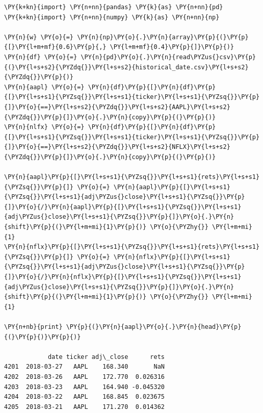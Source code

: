 \begin{tcolorbox}[breakable, size=fbox, boxrule=1pt, pad at break*=1mm,colback=cellbackground, colframe=cellborder]
\begin{Verbatim}[commandchars=\\\{\}]
\PY{k+kn}{import} \PY{n+nn}{pandas} \PY{k}{as} \PY{n+nn}{pd}
\PY{k+kn}{import} \PY{n+nn}{numpy} \PY{k}{as} \PY{n+nn}{np}

\PY{n}{w} \PY{o}{=} \PY{n}{np}\PY{o}{.}\PY{n}{array}\PY{p}{(}\PY{p}{[}\PY{l+m+mf}{0.6}\PY{p}{,} \PY{l+m+mf}{0.4}\PY{p}{]}\PY{p}{)}
\PY{n}{df} \PY{o}{=} \PY{n}{pd}\PY{o}{.}\PY{n}{read\PYZus{}csv}\PY{p}{(}\PY{l+s+s2}{\PYZdq{}}\PY{l+s+s2}{historical_date.csv}\PY{l+s+s2}{\PYZdq{}}\PY{p}{)}
\PY{n}{aapl} \PY{o}{=} \PY{n}{df}\PY{p}{[}\PY{n}{df}\PY{p}{[}\PY{l+s+s1}{\PYZsq{}}\PY{l+s+s1}{ticker}\PY{l+s+s1}{\PYZsq{}}\PY{p}{]}\PY{o}{==}\PY{l+s+s2}{\PYZdq{}}\PY{l+s+s2}{AAPL}\PY{l+s+s2}{\PYZdq{}}\PY{p}{]}\PY{o}{.}\PY{n}{copy}\PY{p}{(}\PY{p}{)}
\PY{n}{nlfx} \PY{o}{=} \PY{n}{df}\PY{p}{[}\PY{n}{df}\PY{p}{[}\PY{l+s+s1}{\PYZsq{}}\PY{l+s+s1}{ticker}\PY{l+s+s1}{\PYZsq{}}\PY{p}{]}\PY{o}{==}\PY{l+s+s2}{\PYZdq{}}\PY{l+s+s2}{NFLX}\PY{l+s+s2}{\PYZdq{}}\PY{p}{]}\PY{o}{.}\PY{n}{copy}\PY{p}{(}\PY{p}{)}
		
\PY{n}{aapl}\PY{p}{[}\PY{l+s+s1}{\PYZsq{}}\PY{l+s+s1}{rets}\PY{l+s+s1}{\PYZsq{}}\PY{p}{]} \PY{o}{=} \PY{n}{aapl}\PY{p}{[}\PY{l+s+s1}{\PYZsq{}}\PY{l+s+s1}{adj\PYZus{}close}\PY{l+s+s1}{\PYZsq{}}\PY{p}{]}\PY{o}{/}\PY{n}{aapl}\PY{p}{[}\PY{l+s+s1}{\PYZsq{}}\PY{l+s+s1}{adj\PYZus{}close}\PY{l+s+s1}{\PYZsq{}}\PY{p}{]}\PY{o}{.}\PY{n}{shift}\PY{p}{(}\PY{l+m+mi}{1}\PY{p}{)} \PY{o}{\PYZhy{}} \PY{l+m+mi}{1}
\PY{n}{nflx}\PY{p}{[}\PY{l+s+s1}{\PYZsq{}}\PY{l+s+s1}{rets}\PY{l+s+s1}{\PYZsq{}}\PY{p}{]} \PY{o}{=} \PY{n}{nflx}\PY{p}{[}\PY{l+s+s1}{\PYZsq{}}\PY{l+s+s1}{adj\PYZus{}close}\PY{l+s+s1}{\PYZsq{}}\PY{p}{]}\PY{o}{/}\PY{n}{nflx}\PY{p}{[}\PY{l+s+s1}{\PYZsq{}}\PY{l+s+s1}{adj\PYZus{}close}\PY{l+s+s1}{\PYZsq{}}\PY{p}{]}\PY{o}{.}\PY{n}{shift}\PY{p}{(}\PY{l+m+mi}{1}\PY{p}{)} \PY{o}{\PYZhy{}} \PY{l+m+mi}{1}

\PY{n+nb}{print} \PY{p}{(}\PY{n}{aapl}\PY{o}{.}\PY{n}{head}\PY{p}{(}\PY{p}{)}\PY{p}{)}

            date ticker adj\_close      rets
4201  2018-03-27   AAPL    168.340       NaN
4202  2018-03-26   AAPL    172.770  0.026316
4203  2018-03-23   AAPL    164.940 -0.045320
4204  2018-03-22   AAPL    168.845  0.023675
4205  2018-03-21   AAPL    171.270  0.014362
\end{Verbatim}
\end{tcolorbox}

